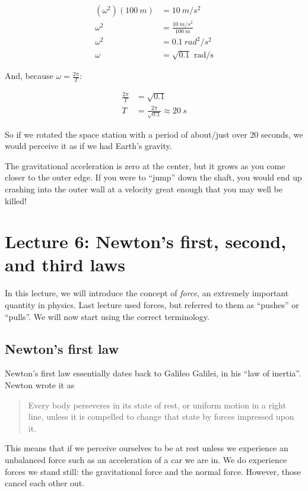 \begin{align}
(\omega^2)(\SI{100}{m}) &= \SI{10}{m/s^2}\\
\omega^2 &= \frac{\SI{10}{m/s^2}}{\SI{100}{m}}\\
\omega^2 &= \SI{0.1}{rad^2/s^2}\\
\omega &= \sqrt{0.1} \text{ rad/s}
\end{align}

And, because $\omega = \frac{2 \pi}{T}$:

\begin{align}
\frac{2 \pi}{T} &= \sqrt{0.1}\\
T &= \frac{2 \pi}{\sqrt{0.1}} \approx \SI{20}{s}
\end{align}

So if we rotated the space station with a period of about/just over 20 seconds, we would perceive it as if we had Earth's gravity.

The gravitational acceleration is zero at the center, but it grows as you come closer to the outer edge. If you were to ``jump'' down the shaft, you would end up crashing into the outer wall at a velocity great enough that you may well be killed!


\section{Lecture 6: Newton's first, second, and third laws}

In this lecture, we will introduce the concept of \emph{force}, an extremely important quantity in physics. Last lecture used forces, but referred to them as ``pushes'' or ``pulls''. We will now start using the correct terminology.

\subsection{Newton's first law}

Newton's first law essentially dates back to Galileo Galilei, in his ``law of inertia''.\\
Newton wrote it as

\begin{quote}
Every body perseveres in its state of rest, or uniform motion in a right line, unless it is compelled to change that state by forces impressed upon it.
\end{quote}

This means that if we perceive ourselves to be at rest unless we experience an unbalanced force such as an acceleration
of a car we are in. We do experience forces we stand still: the gravitational force and the normal force. However,
those cancel each other out.

